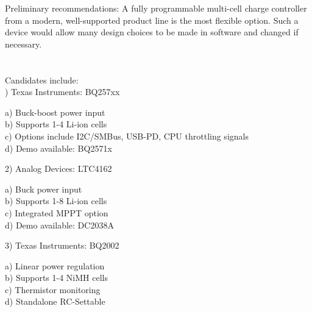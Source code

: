 \documentclass[12pt]{article}
\begin{document}
\noindent
Preliminary recommendations:
A fully programmable multi-cell charge controller from a modern, well-supported product line is the most flexible option. Such a device would allow many design choices to be made in software and changed if necessary.\\
\hfill \\
\pagebreak
\hfill \\
Candidates include:\\

) Texas Instruments: BQ257xx
\begin{addmargin}[0.50cm]{0.75cm}
a) Buck-boost power input\\
b) Supports 1-4 Li-ion cells\\
c) Options include I2C/SMBus, USB-PD, CPU throttling signals\\
d) Demo available: BQ2571x
\end{addmargin}
2) Analog Devices: LTC4162
\begin{addmargin}[0.50cm]{0.75cm}
a) Buck power input\\
b) Supports 1-8 Li-ion cells\\
c) Integrated MPPT option\\
d) Demo available: DC2038A
\end{addmargin}
3) Texas Instruments: BQ2002
\begin{addmargin}[0.50cm]{0.75cm}
a) Linear power regulation\\
b) Supports 1-4 NiMH cells\\
c) Thermistor monitoring\\
d) Standalone RC-Settable\\
\end{addmargin}
\end{document}
